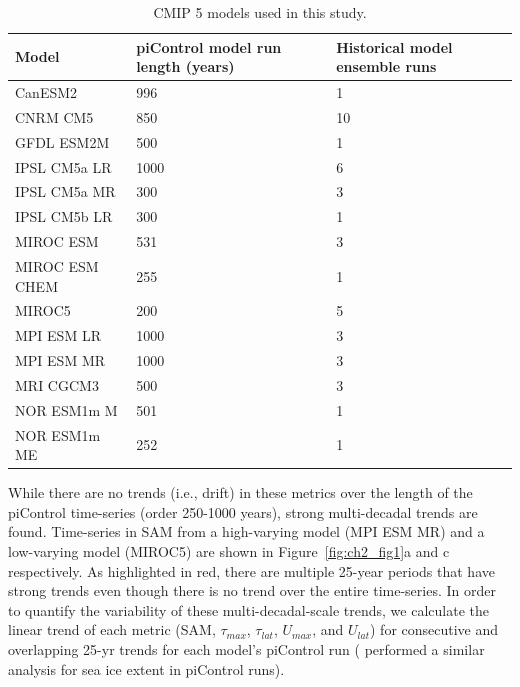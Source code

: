 {\small
\begin{table}[t]
\caption{CMIP 5 models used in this study.}
\centering
\begin{tabular}{ l p{5cm} p{5cm} }
\hline
 Model & piControl model run length (years) & Historical model ensemble  runs \\
\hline
 CanESM2 & 996 & 1\\
 CNRM CM5 & 850 & 10\\
 GFDL ESM2M & 500 & 1\\
 IPSL CM5a LR & 1000 & 6\\
 IPSL CM5a MR & 300 & 3\\
 IPSL CM5b LR & 300 & 1\\
 MIROC ESM & 531 & 3\\
 MIROC ESM CHEM & 255 & 1\\
 MIROC5 & 200 & 5\\
 MPI ESM LR & 1000 & 3\\
 MPI ESM MR & 1000 & 3\\
 MRI CGCM3 & 500 & 3\\
 NOR ESM1m M & 501 & 1\\
 NOR ESM1m ME & 252 & 1\\
\hline
\end{tabular}
\end{table}
}

While there are no trends (i.e., drift) in these metrics over the length of the
piControl time-series (order 250-1000 years), strong multi-decadal trends are
found. Time-series in SAM from a high-varying model (MPI ESM MR) and a
low-varying model (MIROC5) are shown in Figure~\ref{fig:ch2_fig1}a and c
respectively. As highlighted in red, there are multiple 25-year periods that
have strong trends even though there is no trend over the entire time-series.
In order to quantify the variability of these multi-decadal-scale trends, we
calculate the linear trend of each metric (SAM, $\tau_{max}$, $\tau_{lat}$,
$U_{max}$, and $U_{lat}$) for consecutive and overlapping 25-yr trends for each
model's piControl run (\citet{Polvani2013e} performed a similar analysis for
sea ice extent in piControl runs).

